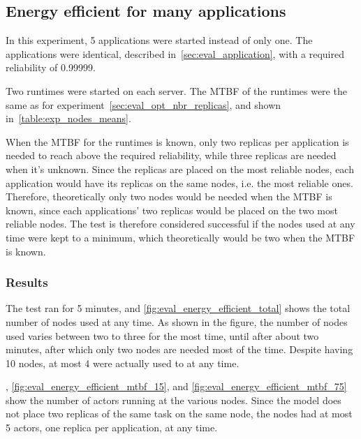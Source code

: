 \documentclass{cslthse-msc}
\begin{document}
\subsection{Energy efficient for many applications} \label{sec:eval_energy_efficient}
In this experiment, 5 applications were started instead of only one. The applications were identical, described in~\cref{sec:eval_application}, with a required reliability of 0.99999. 

Two runtimes were started on each server. The MTBF of the runtimes were the same as for experiment~\cref{sec:eval_opt_nbr_replicas}, and shown in~\cref{table:exp_nodes_means}.

When the MTBF for the runtimes is known, only two replicas per application is needed to reach above the required reliability, while three replicas are needed when it's unknown. Since the replicas are placed on the most reliable nodes, each application would have its replicas on the same nodes, i.e. the most reliable ones. Therefore, theoretically only two nodes would be needed when the MTBF is known, since each applications' two replicas would be placed on the two most reliable nodes. The test is therefore considered successful if the nodes used at any time were kept to a minimum, which theoretically would be two when the MTBF is known.

\subsubsection*{Results}
The test ran for 5 minutes, and \cref{fig:eval_energy_efficient_total} shows the total number of nodes used at any time. As shown in the figure, the number of nodes used varies between two to three for the most time, until after about two minutes, after which only two nodes are needed most of the time. Despite having 10 nodes, at most 4 were actually used to at any time.

, \cref{fig:eval_energy_efficient_mtbf_15}, and \cref{fig:eval_energy_efficient_mtbf_75} show the number of actors running at the various nodes. Since the model does not place two replicas of the same task on the same node, the nodes had at most 5 actors, one replica per application, at any time.
\end{document}
